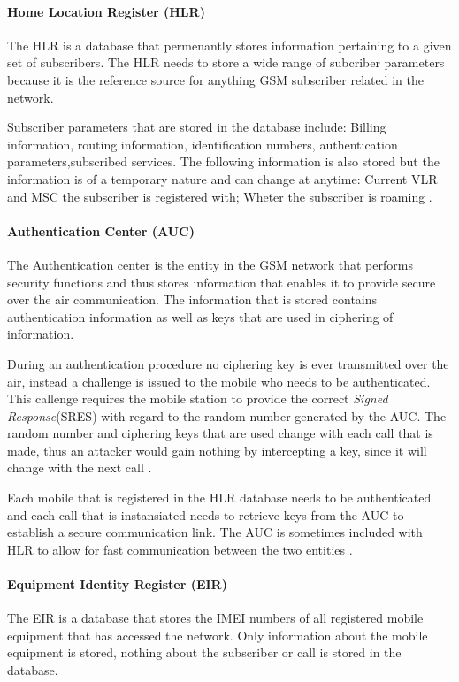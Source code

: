\paragraph{Home Location Register (HLR)}
The HLR is a database that permenantly stores information pertaining to a given set of subscribers. The HLR needs to store a wide range of subcriber parameters because it is the reference source for anything GSM subscriber related in the network. 

Subscriber parameters that are stored in the database include: Billing information, routing information, identification numbers, authentication parameters,subscribed services. The following information is also stored but the information is of a temporary nature and can change at anytime: Current VLR and MSC the subscriber is registered with; Wheter the subscriber is roaming \cite{GSMSysEngin}.

\paragraph{Authentication Center (AUC)}
The Authentication center is the entity in the GSM network that performs security functions and thus stores information that enables it to provide secure over the air communication. The information that is stored contains authentication information as well as keys that are used in ciphering of information.

During an authentication procedure no ciphering key is ever transmitted over the air, instead a challenge is issued to the mobile who needs to be authenticated. This callenge requires the mobile station to provide the correct \emph{Signed Response}(SRES) with regard to the random number generated by the AUC. The random number and ciphering keys that are used change with each call that is made, thus an attacker would gain nothing by intercepting a key, since it will change with the next call \cite{GSMSysEngin}.

Each mobile that is registered in the HLR database needs to be authenticated and each call that is instansiated needs to retrieve keys from the AUC to establish a secure communication link. The AUC is sometimes included with HLR to allow for fast communication between the two entities \cite{GSMSysEngin}.

\paragraph{Equipment Identity Register (EIR)}
The EIR is a database that stores the IMEI numbers of all registered mobile equipment that has accessed the network. Only information about the mobile equipment is stored, nothing about the subscriber or call is stored in the database.

